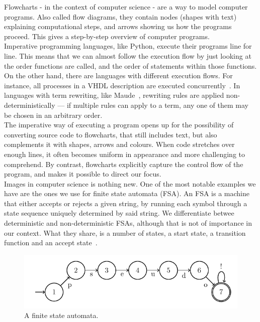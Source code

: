 Flowcharts - in the context of computer science - are a way to model computer programs. Also called flow diagrams, they contain nodes (shapes with text) explaining computational steps, and arrows showing us how the programs proceed. This gives a step-by-step overview of computer programs. \\

Imperative programming languages, like Python, execute their programs line for line. This means that we can almost follow the execution flow by just looking at the order functions are called, and the order of statements within those functions. \\

On the other hand, there are languages with different execution flows. For instance, all processes in a VHDL description are executed concurrently~\cite{vhdl}. In languages with term rewriting, like Maude~\cite{maude}, rewriting rules are applied non-deterministically --- if multiple rules can apply to a term, any one of them may be chosen in an arbitrary order. \\

The imperative way of executing a program opens up for the possibility of converting source code to flowcharts, that still includes text, but also complements it with shapes, arrows and colours. When code stretches over enough lines, it often becomes uniform in appearance and more challenging to comprehend. By contrast, flowcharts explicitly capture the control flow of the program, and makes it possible to direct our focus. \\

Images in computer science is nothing new. One of the most notable examples we have are the ones we use for finite state automata (FSA). An FSA is a machine that either accepts or rejects a given string, by running each symbol through a state sequence uniquely determined by said string. We differentiate betwee deterministic and non-deterministic FSAs, although that is not of importance in our context. What they share, is a number of states, a start state, a transition function and an accept state~\cite{introToAutomataTheory}. \\

\begin{figure}[ht]
    \centering
    \includegraphics[scale=1.1]{assets/chapter2/Automata.pdf}
    \caption{A finite state automata.}
    \label{An example finite state automata.}
\end{figure}

